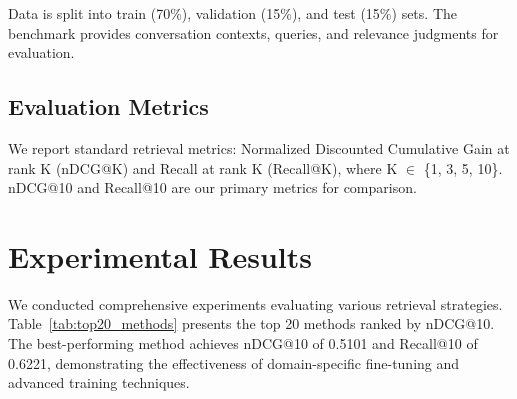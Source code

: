 \documentclass[conference]{IEEEtran}
\begin{document}
Data is split into train (70\%), validation (15\%), and test (15\%) sets. The benchmark provides conversation contexts, queries, and relevance judgments for evaluation.

\subsection{Evaluation Metrics}
We report standard retrieval metrics: Normalized Discounted Cumulative Gain at rank K (nDCG@K) and Recall at rank K (Recall@K), where K $\in$ \{1, 3, 5, 10\}. nDCG@10 and Recall@10 are our primary metrics for comparison.

\section{Experimental Results}

We conducted comprehensive experiments evaluating various retrieval strategies. Table~\ref{tab:top20_methods} presents the top 20 methods ranked by nDCG@10. The best-performing method achieves nDCG@10 of 0.5101 and Recall@10 of 0.6221, demonstrating the effectiveness of domain-specific fine-tuning and advanced training techniques.
\end{document}
